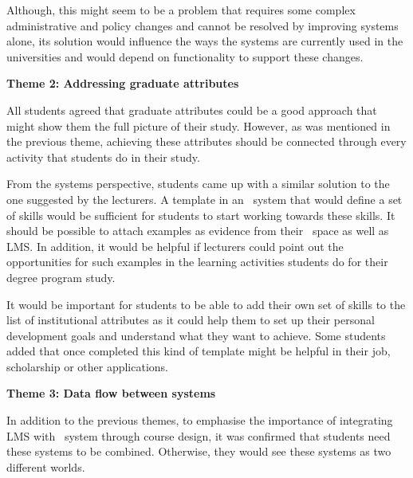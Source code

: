 Although, this might seem to be a problem that requires some complex
administrative and policy changes and cannot be resolved by improving systems
alone, its solution would influence the ways the systems are currently used in
the universities and would depend on functionality to support these changes.

\textbf{Theme 2: Addressing graduate attributes}

All students agreed that graduate attributes could be a good approach that might
show them the full picture of their study. However, as was mentioned in the
previous theme, achieving these attributes should be connected through every
activity that students do in their study.


From the systems perspective, students came up with a similar solution to the
one suggested by the lecturers. A template in an \ep~system that would define a
set of \LLLs skills would be sufficient for students to start working towards
these skills. It should be possible to attach examples as evidence from their
\ep~space as well as LMS. In addition, it would be helpful if lecturers could
point out the opportunities for such examples in the learning activities
students do for their degree program study.

It would be important for students to be able to add their own set of skills to
the list of institutional attributes as it could help them to set up their
personal development goals and understand what they want to achieve. Some
students added that once completed this kind of template might be helpful in
their job, scholarship or other applications.

\textbf{Theme 3: Data flow between systems}

In addition to the previous themes, to emphasise the importance of integrating
LMS with \ep~system through course design, it was confirmed that students need
these systems to be combined. Otherwise, they would see these systems as two
different worlds.



